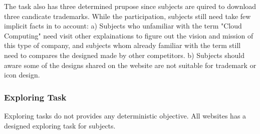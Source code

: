 \begin{itemize}
        The task also has three determined prupose since subjects are quired to download three candicate trademarks.
        While the participation, subjects still need take few implicit facts in to account:
        a) Subjects who unfamiliar with the term "Cloud Computing" need visit other explainations to figure out
        the vision and mission of this type of company, and subjects whom already familiar with the term
        still need to compares the designed made by other competitors.
        b) Subjects should aware some of the designs shared on the website are not suitable for trademark or icon design.
\end{itemize}

\subsubsection{Exploring Task}

Exploring tasks do not provides any deterministic objective. All websites has a designed exploring task
for subjects.

